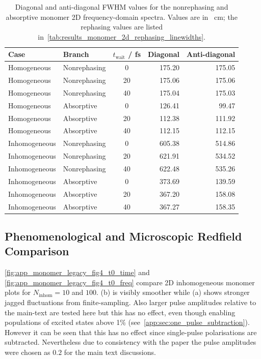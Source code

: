 \begin{table}[htbp]
    \centering
    \scriptsize
    \caption{Diagonal and anti-diagonal FWHM values for the nonrephasing and
    absorptive monomer 2D frequency-domain spectra. Values are in
    \si{\per\centi\metre}; the rephasing values are listed
    in~\autoref{tab:results_monomer_2d_rephasing_linewidths}.}
    \label{tab:app_monomer_2d_branch_linewidths}
    \begin{tabular}{@{}llcrr@{}}
        \toprule
        Case & Branch & $t_{\mathrm{wait}}$ / fs & Diagonal & Anti-diagonal \\
        \midrule
        Homogeneous & Nonrephasing & 0  & 175.20 & 175.05 \\
        Homogeneous & Nonrephasing & 20 & 175.06 & 175.06 \\
        Homogeneous & Nonrephasing & 40 & 175.04 & 175.03 \\
        Homogeneous & Absorptive & 0  & 126.41 & 99.47 \\
        Homogeneous & Absorptive & 20 & 112.38 & 111.92 \\
        Homogeneous & Absorptive & 40 & 112.15 & 112.15 \\
        Inhomogeneous & Nonrephasing & 0  & 605.38 & 514.86 \\
        Inhomogeneous & Nonrephasing & 20 & 621.91 & 534.52 \\
        Inhomogeneous & Nonrephasing & 40 & 622.48 & 535.26 \\
        Inhomogeneous & Absorptive & 0  & 373.69 & 139.59 \\
        Inhomogeneous & Absorptive & 20 & 367.20 & 158.08 \\
        Inhomogeneous & Absorptive & 40 & 367.27 & 158.35 \\
        \bottomrule
    \end{tabular}
\end{table}

\subsection{Phenomenological and Microscopic Redfield Comparison}

\autoref{fig:app_monomer_legacy_fig4_t0_time} and
\autoref{fig:app_monomer_legacy_fig4_t0_freq} compare 2D inhomogeneous
monomer plots for \(N_{\mathrm{inhom}}=10\) and \(100\). (b) is visibly smoother while (a) shows stronger jagged fluctuations from finite-sampling. Also larger pulse amplitudes relative to the main-text are tested here but this has no effect, even though enabling populations of excited states above 1\% (see~\autoref{app:sec:one_pulse_subtraction}). However it can be seen that this has no effect since single-pulse polarisations are subtracted. Nevertheless due to consistency with the paper the pulse amplitudes were chosen as $0.2$ for the main text discussions.


